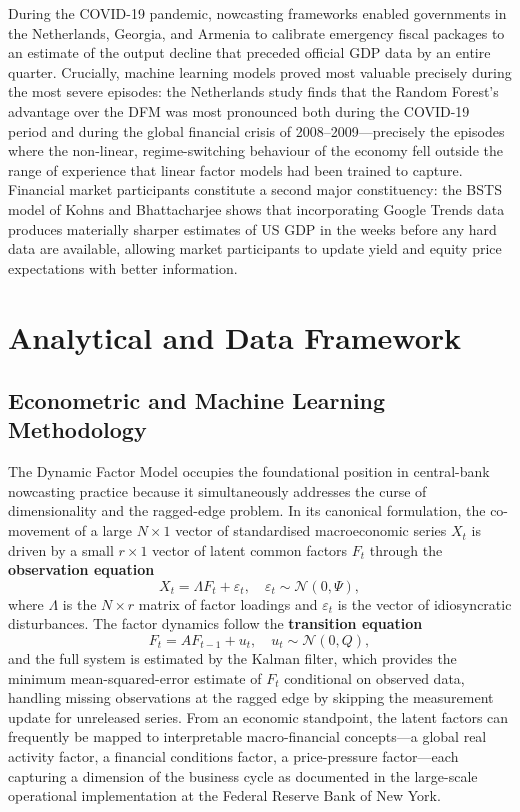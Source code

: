 \documentclass[12pt,a4paper]{report}
\begin{document}
During the COVID-19 pandemic, nowcasting frameworks enabled governments
in the Netherlands, Georgia, and Armenia to calibrate emergency fiscal
packages to an estimate of the output decline that preceded official GDP
data by an entire quarter. Crucially, machine learning models proved
most valuable precisely during the most severe episodes: the Netherlands
study finds that the Random Forest's advantage over the DFM was most
pronounced both during the COVID-19 period and during the global
financial crisis of 2008--2009---precisely the episodes where the
non-linear, regime-switching behaviour of the economy fell outside the
range of experience that linear factor models had been trained to
capture.\citep{NetherlandsDNB2022} Financial market participants constitute
a second major constituency: the BSTS model of Kohns and Bhattacharjee
shows that incorporating Google Trends data produces materially sharper
estimates of US GDP in the weeks before any hard data are available,
allowing market participants to update yield and equity price
expectations with better information.\citep{US2022}

\chapter{Analytical and Data Framework}

\section{Econometric and Machine Learning Methodology}

The Dynamic Factor Model occupies the foundational position in
central-bank nowcasting practice because it simultaneously addresses the
curse of dimensionality and the ragged-edge problem. In its canonical
formulation, the co-movement of a large \(N \times 1\) vector of
standardised macroeconomic series \(X_t\) is driven by a small
\(r \times 1\) vector of latent common factors \(F_t\) through the
\textbf{observation equation}
\begin{equation}
    X_t = \Lambda F_t + \varepsilon_t, \quad \varepsilon_t \sim \mathcal{N}(0,\Psi),
\end{equation}
where \(\Lambda\) is the \(N \times r\) matrix of factor loadings and
\(\varepsilon_t\) is the vector of idiosyncratic disturbances. The
factor dynamics follow the \textbf{transition equation}
\begin{equation}
    F_t = A F_{t-1} + u_t, \quad u_t \sim \mathcal{N}(0,Q),
\end{equation}
and the full system is estimated by the Kalman filter, which provides
the minimum mean-squared-error estimate of \(F_t\) conditional on
observed data, handling missing observations at the ragged edge by
skipping the measurement update for unreleased series.\citep{Giannone2008}
From an economic standpoint, the latent factors can frequently be mapped
to interpretable macro-financial concepts---a global real activity
factor, a financial conditions factor, a price-pressure factor---each
capturing a dimension of the business cycle as documented in the
large-scale operational implementation at the Federal Reserve Bank of
New York.\citep{Bok2017}
\end{document}
